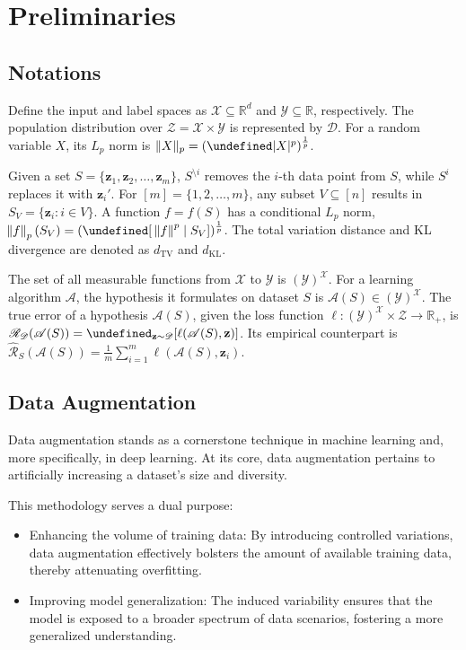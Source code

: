 \documentclass[preprint,12pt,authoryear]{elsarticle}
\newcommand{\E}{\mathbb{E}}
\newcommand{\sA}{{\mathscr A}}
\newcommand{\sD}{{\mathscr D}}
\newcommand{\sR}{{\mathscr R}}
\newcommand{\sX}{{\mathscr X}}
\newcommand{\sY}{{\mathscr Y}}
\newcommand{\sZ}{{\mathscr Z}}
\newcommand{\bz}{{\mathbf z}}
\let\E\undefined
\newcommand{\R}{\mathbb R}
\newcommand{\E}{\mathbb E}
\newcommand\Sdrop[1]{S^{\setminus #1}}
\newcommand\Schange[1]{S^{#1}}
\begin{document}
\section{Preliminaries}

\subsection{Notations}

Define the input and label spaces as $\mathscr{X} \subseteq \R^d$ and $\mathscr{Y} \subseteq \R$, respectively. The population distribution over $\mathscr{Z} = \mathscr{X} \times \mathscr{Y}$ is represented by $\mathscr{D}$. For a random variable $X$, its $L_p$ norm is $\Vert X\Vert_p = (\E|X|^p)^{\frac{1}{p}}$.

Given a set $S = \{\bz_1, \bz_2, \dots, \bz_m\}$, $\Sdrop{i}$ removes the $i$-th data point from $S$, while $\Schange{i}$ replaces it with $\bz_i'$. For $[m] = \{1,2,\dots,m\}$, any subset $V \subseteq [n]$ results in $S_V = \{\bz_i: i \in V\}$. A function $f = f(S)$ has a conditional $L_p$ norm, $\norm{f}_p(S_V) = (\E[\ \norm{f}^p \mid S_V])^{\frac{1}{p}}$. The total variation distance and KL divergence are denoted as $d_{\mathrm{TV}}$ and $d_{\mathrm{KL}}$.

The set of all measurable functions from $\sX$ to $\sY$ is $(\sY)^{\sX}$. For a learning algorithm $\sA$, the hypothesis it formulates on dataset $S$ is $\sA(S) \in (\sY)^{\sX}$. The true error of a hypothesis $\sA(S)$, given the loss function $\ell: (\sY)^{\sX} \times \sZ \rightarrow \R_+$, is $\sR_{\sD}(\sA(S)) = \E_{\bz \sim \sD} [\ell(\sA(S), \bz)]$. Its empirical counterpart is $\widehat{\sR}_{S}(\sA(S)) = \frac{1}{m} \sum_{i=1}^m \ell(\sA(S), \bz_i)$.\cite{60_Theory}


\subsection{Data Augmentation}
Data augmentation\cite{49_TDA,50_TDA,51_TDA,52_TDA,53_TDA,54_TDA,55_TDA,56_TDA,57_TDA,58_TDA,59_TDA} stands as a cornerstone technique in machine learning and, more specifically, in deep learning. At its core, data augmentation pertains to artificially increasing a dataset's size and diversity.

This methodology serves a dual purpose:
\begin{itemize}
    \item Enhancing the volume of training data: By introducing controlled variations, data augmentation effectively bolsters the amount of available training data, thereby attenuating overfitting.
    \item Improving model generalization: The induced variability ensures that the model is exposed to a broader spectrum of data scenarios, fostering a more generalized understanding.
\end{itemize}
\end{document}
